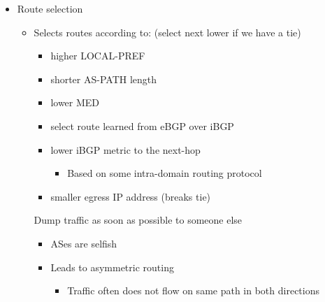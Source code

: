 \begin{itemize}
\begin{itemize}
\begin{itemize}
                    \item Route selection
                        \begin{itemize}
                             BGP selects a single route
                                \begin{itemize}
                                    \icon Optimisation not possible
                                \end{itemize}
                            \item Selects routes according to: (select next lower if we have a tie)
                                \begin{itemize}
                                    \item higher LOCAL-PREF
                                    \item shorter AS-PATH length
                                    \item lower MED
                                    \item select route learned from eBGP over iBGP
                                    \item lower iBGP metric to the next-hop
                                        \begin{itemize}
                                            \item Based on some intra-domain routing protocol
                                        \end{itemize}
                                    \item smaller egress IP address (breaks tie)
                                \end{itemize}
                             Dump traffic as soon as possible to someone else
                                \begin{itemize}
                                    \item ASes are selfish
                                    \item Leads to asymmetric routing
                                        \begin{itemize}
                                            \item Traffic often does not flow on same path in both directions
                                        \end{itemize}
                                \end{itemize}

\end{itemize}
\end{itemize}
\end{itemize}
\end{itemize}
